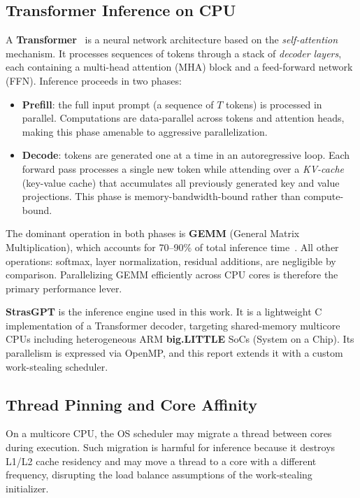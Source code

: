 \documentclass[11pt,english]{article}
\begin{document}
\subsection{Transformer Inference on CPU}

A \textbf{Transformer}~\cite{vaswani2017attention} is a neural network architecture based on the \emph{self-attention} mechanism. It processes sequences of tokens through a stack of \emph{decoder layers}, each containing a multi-head attention (MHA) block and a feed-forward network (FFN). Inference proceeds in two phases:

\begin{itemize}
    \item \textbf{Prefill}: the full input prompt (a sequence of $T$ tokens) is processed in parallel. Computations are data-parallel across tokens and attention heads, making this phase amenable to aggressive parallelization.
    \item \textbf{Decode}: tokens are generated one at a time in an autoregressive loop. Each forward pass processes a single new token while attending over a \emph{KV-cache} (key-value cache) that accumulates all previously generated key and value projections. This phase is memory-bandwidth-bound rather than compute-bound.
\end{itemize}

The dominant operation in both phases is \textbf{GEMM} (General Matrix Multiplication), which accounts for 70--90\% of total inference time~\cite{dice2021transformercpu}. All other operations: softmax, layer normalization, residual additions, are negligible by comparison. Parallelizing GEMM efficiently across CPU cores is therefore the primary performance lever.

\textbf{StrasGPT} is the inference engine used in this work. It is a lightweight C implementation of a Transformer decoder, targeting shared-memory multicore CPUs including heterogeneous ARM \textbf{big.LITTLE} SoCs (System on a Chip). Its parallelism is expressed via OpenMP, and this report extends it with a custom work-stealing scheduler.

\subsection{Thread Pinning and Core Affinity}

On a multicore CPU, the OS scheduler may migrate a thread between cores during execution. Such migration is harmful for inference because it destroys L1/L2 cache residency and may move a thread to a core with a different frequency, disrupting the load balance assumptions of the work-stealing initializer.
\end{document}
